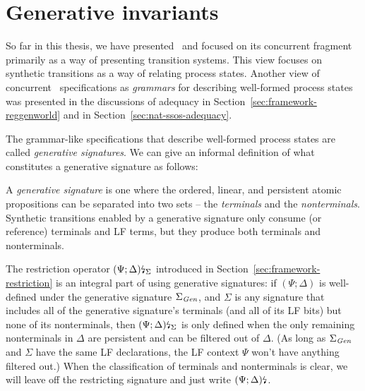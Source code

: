\chapter{Generative invariants}
\label{chapter-gen}

So far in this thesis, we have presented \sls~and focused on its
concurrent fragment primarily as a way of presenting transition
systems. This view focuses on synthetic transitions as a way of
relating process states. Another view of concurrent
\sls~specifications as {\it grammars} for describing well-formed
process states was presented in the discussions of adequacy in
Section~\ref{sec:framework-reggenworld} and in
Section~\ref{sec:nat-ssos-adequacy}. 

The grammar-like specifications that describe well-formed process
states are called {\it generative signatures}. We can give
an informal definition of what constitutes a generative signature
as follows:

\bigskip
\begin{definition}\label{def:gensig}
  A {\em generative signature} is one where the ordered, linear, and
  persistent atomic propositions can be separated into two sets -- the
  {\em terminals} and the {\em nonterminals}. Synthetic transitions
  enabled by a generative signature only consume (or reference) 
  terminals and LF terms, but they produce both terminals 
  and nonterminals.
\end{definition}
\bigskip

\noindent
The restriction operator ${(\Psi; \Delta)}{\mbox{\lightning}}_{\Sigma}$
introduced in Section~\ref{sec:framework-restriction} is an integral
part of using generative signatures: if $(\Psi; \Delta)$ is
well-defined under the generative signature $\Sigma_{\it Gen}$, and
$\Sigma$ is any signature that includes all of the generative
signature's terminals (and all of its LF bits) but none of its
nonterminals, then ${(\Psi; \Delta)}{\mbox{\lightning}}_{\Sigma}$ is only
defined when the only remaining nonterminals in $\Delta$ are persistent
and can be filtered out of $\Delta$. (As long as $\Sigma_{\it Gen}$
and $\Sigma$ have the same LF declarations, the LF context 
$\Psi$ won't have anything filtered out.) When the classification of
terminals and nonterminals is clear, we will leave off the restricting
signature and just write ${(\Psi; \Delta)}{\mbox{\lightning}}_{}$.

